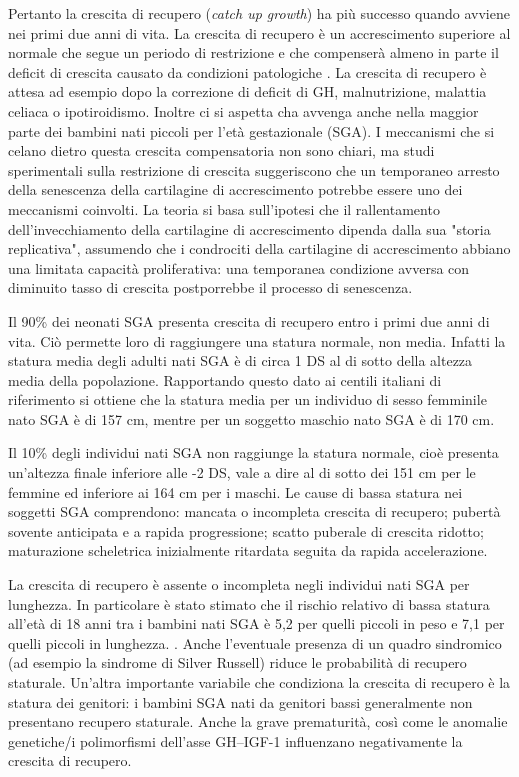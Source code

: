  Pertanto la crescita di recupero (\textit{catch up growth}) ha più successo quando avviene nei primi due anni di vita. La crescita di recupero è un accrescimento superiore al normale che segue un periodo di restrizione e che compenserà almeno in parte il deficit di crescita causato da condizioni patologiche \cite{boersma1997catch}.
La crescita di recupero è attesa ad esempio dopo la correzione di deficit di GH, malnutrizione, malattia celiaca o ipotiroidismo. Inoltre ci si aspetta cha avvenga anche nella maggior parte dei bambini nati piccoli per l'età gestazionale (SGA). I meccanismi che si celano dietro questa crescita compensatoria non sono chiari, ma studi sperimentali sulla restrizione di crescita suggeriscono che un temporaneo arresto della senescenza della cartilagine di accrescimento potrebbe essere uno dei meccanismi 
coinvolti.\cite{gafni2001catch}
La teoria si basa sull'ipotesi che il rallentamento dell'invecchiamento della cartilagine di accrescimento dipenda dalla sua "storia replicativa", assumendo che i condrociti della cartilagine di accrescimento abbiano una limitata capacità proliferativa: una temporanea condizione avversa con diminuito tasso di crescita postporrebbe il processo di senescenza.

Il 90\% dei neonati SGA presenta crescita di recupero entro i primi due anni di
vita\cite{karlberg1995growth}. Ciò permette loro di raggiungere una statura normale, non media. Infatti la statura media degli adulti nati SGA è di circa 1 DS al di sotto della altezza 
media della popolazione\cite{leger1997reduced}. Rapportando questo dato ai centili italiani di riferimento \cite{cacciari2006italian}
si ottiene che la statura media per un individuo di sesso femminile nato SGA è di 157 cm, mentre per un soggetto maschio nato SGA è di 170 cm. 

Il 10\% degli individui nati SGA non raggiunge la statura normale, cioè presenta un'altezza finale inferiore alle -2 DS, vale a dire al di sotto dei 151 cm per le femmine ed inferiore ai 164 cm per i maschi. 
Le cause di bassa statura nei soggetti SGA comprendono: mancata o incompleta crescita di recupero; pubertà sovente anticipata e a rapida progressione; scatto puberale di crescita ridotto; maturazione scheletrica inizialmente ritardata seguita da rapida accelerazione. 

La crescita di recupero è assente o incompleta negli individui nati SGA per lunghezza. In particolare è stato stimato che il rischio relativo di bassa statura all'età di 18 anni tra i bambini nati SGA è 5,2 per quelli 
piccoli in peso e 7,1 per quelli piccoli in lunghezza. \cite{cianfarani2006hormonal}. Anche l'eventuale presenza di un quadro sindromico (ad esempio la sindrome di Silver Russell) riduce le probabilità di recupero staturale. Un'altra importante variabile che condiziona la crescita di recupero è la statura dei genitori: i bambini SGA nati da genitori bassi generalmente non presentano recupero staturale. Anche la grave prematurità, così come le anomalie genetiche/i polimorfismi dell'asse GH--IGF-1 influenzano negativamente la crescita di recupero. 

